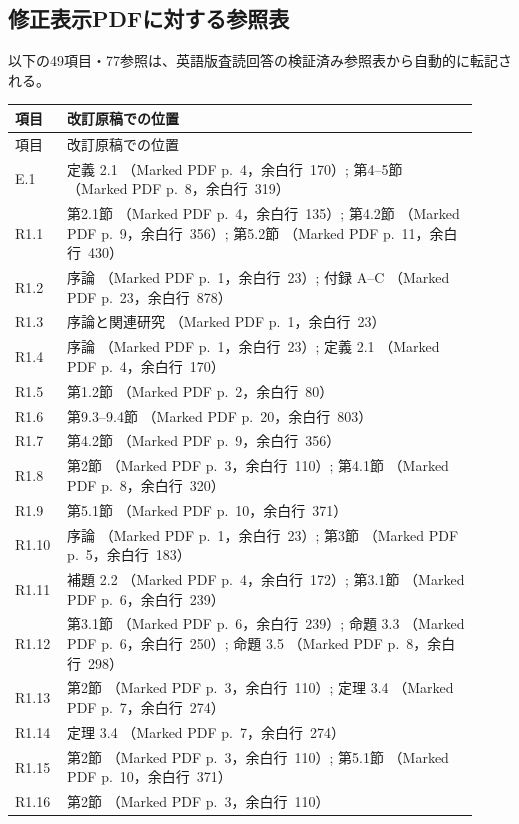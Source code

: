 \subsection*{修正表示PDFに対する参照表}
以下の49項目・77参照は、英語版査読回答の検証済み参照表から自動的に転記される。
\begingroup\small
\setlength{\LTpre}{4pt}\setlength{\LTpost}{6pt}
\begin{longtable}{@{}p{0.09\linewidth}p{0.83\linewidth}@{}}
\toprule
項目 & 改訂原稿での位置\\
\midrule\endfirsthead
\toprule
項目 & 改訂原稿での位置\\
\midrule\endhead
E.1 & 定義 2.1 （Marked PDF p.~4，余白行~170）; 第4--5節 （Marked PDF p.~8，余白行~319）\\
R1.1 & 第2.1節 （Marked PDF p.~4，余白行~135）; 第4.2節 （Marked PDF p.~9，余白行~356）; 第5.2節 （Marked PDF p.~11，余白行~430）\\
R1.2 & 序論 （Marked PDF p.~1，余白行~23）; 付録 A--C （Marked PDF p.~23，余白行~878）\\
R1.3 & 序論と関連研究 （Marked PDF p.~1，余白行~23）\\
R1.4 & 序論 （Marked PDF p.~1，余白行~23）; 定義 2.1 （Marked PDF p.~4，余白行~170）\\
R1.5 & 第1.2節 （Marked PDF p.~2，余白行~80）\\
R1.6 & 第9.3--9.4節 （Marked PDF p.~20，余白行~803）\\
R1.7 & 第4.2節 （Marked PDF p.~9，余白行~356）\\
R1.8 & 第2節 （Marked PDF p.~3，余白行~110）; 第4.1節 （Marked PDF p.~8，余白行~320）\\
R1.9 & 第5.1節 （Marked PDF p.~10，余白行~371）\\
R1.10 & 序論 （Marked PDF p.~1，余白行~23）; 第3節 （Marked PDF p.~5，余白行~183）\\
R1.11 & 補題 2.2 （Marked PDF p.~4，余白行~172）; 第3.1節 （Marked PDF p.~6，余白行~239）\\
R1.12 & 第3.1節 （Marked PDF p.~6，余白行~239）; 命題 3.3 （Marked PDF p.~6，余白行~250）; 命題 3.5 （Marked PDF p.~8，余白行~298）\\
R1.13 & 第2節 （Marked PDF p.~3，余白行~110）; 定理 3.4 （Marked PDF p.~7，余白行~274）\\
R1.14 & 定理 3.4 （Marked PDF p.~7，余白行~274）\\
R1.15 & 第2節 （Marked PDF p.~3，余白行~110）; 第5.1節 （Marked PDF p.~10，余白行~371）\\
R1.16 & 第2節 （Marked PDF p.~3，余白行~110）\\

\end{longtable}
